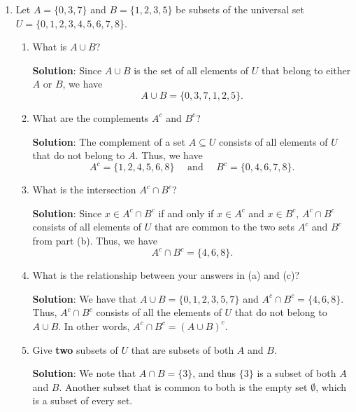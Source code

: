 \documentclass[12pt]{article}
\newcommand{\points}[1]{\marginpar{\hspace{24pt}[#1]}}
\begin{document}
\thispagestyle{fancy}

 \begin{enumerate}
 \item  Let $A = \{0,3,7\}$ and $B = \{1,2,3,5\}$ be subsets of the universal set $U = \{0,1,2,3,4,5,6,7,8\}$.
\begin{enumerate}
 \item What is $A\cup B$? \points{1}

\bigskip

{\bf Solution}: Since $A\cup B$ is the set of all elements of $U$ that belong to either $A$ or $B$, we have
\[
 A\cup B = \{0,3,7,1,2,5\}.
\]

\bigskip

\item What are the complements $A^c$ and $B^c$? \points{1}

\bigskip

{\bf Solution}: The complement of a set $A\subseteq U$ consists of all elements of $U$ that do not belong to $A$. Thus, we have
\[
 A^c =\{1,2,4,5,6,8\}\quad\text{ and }\quad B^c = \{0,4,6,7,8\}.
\]

\bigskip

\item What is the intersection $A^c\cap B^c$? \points{1}

\bigskip

{\bf Solution}: Since $x\in A^c\cap B^c$ if and only if $x\in A^c$ and $x\in B^c$, $A^c\cap B^c$ consists of all elements of $U$ that are common to the two sets $A^c$ and $B^c$ from part (b). Thus, we have
\[
 A^c\cap B^c = \{4,6,8\}.
\]

\bigskip

\item What is the relationship between your answers in (a) and (c)? \points{1}

\bigskip

{\bf Solution}: We have that $A\cup B = \{0,1,2,3,5,7\}$ and $A^c\cap B^c = \{4,6,8\}$. Thus, $A^c\cap B^c$ consists of all the elements of $U$ that do not belong to $A\cup B$. In other words, $A^c\cap B^c = (A\cup B)^c$.

\bigskip

\item Give {\bf two} subsets of $U$ that are subsets of both $A$ and $B$. \points{1}

\bigskip

{\bf Solution}: We note that $A\cap B = \{3\}$, and thus $\{3\}$ is a subset of both $A$ and $B$. Another subset that is common to both is the empty set $\emptyset$, which is a subset of every set.


\end{enumerate}
\end{enumerate}
\end{document}
